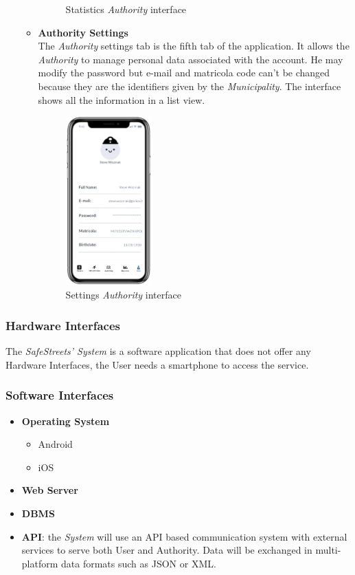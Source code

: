 \documentclass {article}
\begin{document}
\begin{itemize}
\begin{itemize}
\begin{figure}[H]
				\caption{Statistics {\it Authority} interface}
			\end{figure}
			\item {\bf Authority Settings} \\
			The {\it Authority} settings tab is the fifth tab of the application. It allows the {\it Authority} to manage personal data associated with the account. He may modify the password but e-mail and matricola code can't be changed because they are the identifiers given by the {\it Municipality}. The interface shows all the information in a list view.
				\begin{figure}[H]
				\centering
				\includegraphics[height=6.5cm]{Images/Interfaces/auth_settings.png}
				\caption{Settings {\it Authority} interface}
			\end{figure}
			\end{itemize}
	\end{itemize}
	\subsubsection{Hardware Interfaces}
	The {\it SafeStreets' System} is a software application that does not offer any Hardware Interfaces, the User needs a smartphone to access the service.  
	\subsubsection{Software Interfaces}
	\begin{itemize}
		\item {\bf Operating System}
			\begin{itemize}
			\item Android
			\item iOS
			\end{itemize}
		\item {\bf Web Server}
		\item {\bf DBMS}
		\item {\bf API}: the {\it System} will use an API based communication system with external services to serve both User and Authority. Data will be exchanged in multi-platform data formats such as JSON or XML.
	\end{itemize}
\end{document}
